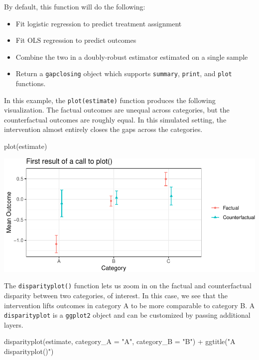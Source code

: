 \documentclass[
]{article}
\newenvironment{Shaded}{\begin{snugshade}}{\end{snugshade}}
\newcommand{\AttributeTok}[1]{\textcolor[rgb]{0.77,0.63,0.00}{#1}}
\newcommand{\FunctionTok}[1]{\textcolor[rgb]{0.00,0.00,0.00}{#1}}
\newcommand{\NormalTok}[1]{#1}
\newcommand{\SpecialCharTok}[1]{\textcolor[rgb]{0.00,0.00,0.00}{#1}}
\newcommand{\StringTok}[1]{\textcolor[rgb]{0.31,0.60,0.02}{#1}}
\providecommand{\tightlist}{%
  \setlength{\itemsep}{0pt}\setlength{\parskip}{0pt}}
\begin{document}
By default, this function will do the following:

\begin{itemize}
\tightlist
\item
  Fit logistic regression to predict treatment assignment
\item
  Fit OLS regression to predict outcomes
\item
  Combine the two in a doubly-robust estimator estimated on a single sample
\item
  Return a \texttt{gapclosing} object which supports \texttt{summary}, \texttt{print}, and \texttt{plot} functions.
\end{itemize}

In this example, the \texttt{plot(estimate)} function produces the following visualization. The factual outcomes are unequal across categories, but the counterfactual outcomes are roughly equal. In this simulated setting, the intervention almost entirely closes the gaps across the categories.

\begin{Shaded}
\begin{Highlighting}[]
\FunctionTok{plot}\NormalTok{(estimate)}
\end{Highlighting}
\end{Shaded}

\includegraphics{github_doc_files/figure-latex/unnamed-chunk-12-1.pdf}

The \texttt{disparityplot()} function lets us zoom in on the factual and counterfactual disparity between two categories, of interest. In this case, we see that the intervention lifts outcomes in category A to be more comparable to category B. A \texttt{disparityplot} is a \texttt{ggplot2} object and can be customized by passing additional layers.

\begin{Shaded}
\begin{Highlighting}[]
\FunctionTok{disparityplot}\NormalTok{(estimate, }\AttributeTok{category\_A =} \StringTok{"A"}\NormalTok{, }\AttributeTok{category\_B =} \StringTok{"B"}\NormalTok{) }\SpecialCharTok{+}
  \FunctionTok{ggtitle}\NormalTok{(}\StringTok{"A disparityplot()"}\NormalTok{)}
\end{Highlighting}
\end{Shaded}
\end{document}
